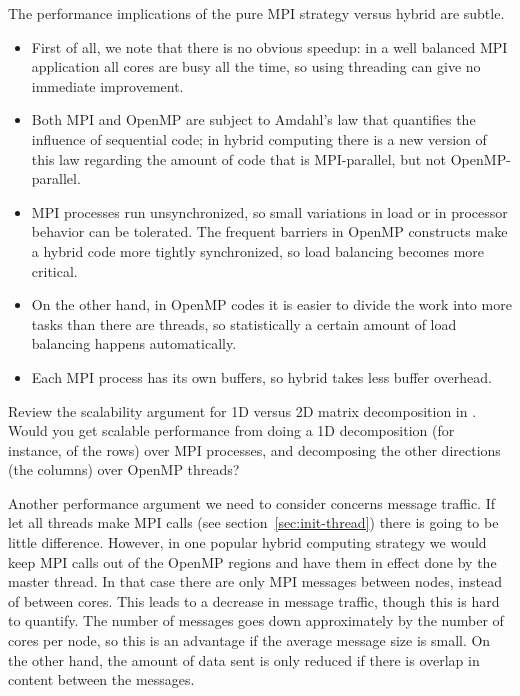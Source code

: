 The performance implications of the pure MPI strategy versus hybrid
are subtle.
\begin{itemize}
\item First of all, we note that there is no obvious speedup: in a
  well balanced MPI application all cores are busy all the time, so
  using threading can give no immediate improvement.
\item Both MPI and OpenMP are subject to Amdahl's law that quantifies
  the influence of sequential code; in hybrid computing there is a new
  version of this law regarding the amount of code that is
  MPI-parallel, but not OpenMP-parallel.
\item MPI processes run unsynchronized, so small variations in load or
  in processor behavior can be tolerated. The frequent barriers in
  OpenMP constructs make a hybrid code more tightly synchronized, so
  load balancing becomes more critical.
\item On the other hand, in OpenMP codes it is easier to divide the
  work into more tasks than there are threads, so statistically a
  certain amount of load balancing happens automatically.
\item Each MPI process has its own buffers, so hybrid takes less
  buffer overhead.
\end{itemize}

\begin{exercise}
  Review the scalability argument for 1D versus 2D matrix
  decomposition in . Would you get
  scalable performance from doing a 1D decomposition (for instance, of
  the rows) over MPI processes, and decomposing the other directions
  (the columns) over OpenMP threads?
\end{exercise}

Another performance argument we need to consider concerns message
traffic.  If let all threads make MPI calls (see
section~\ref{sec:init-thread}) there is going to be little
difference. However, in one popular hybrid computing strategy we would
keep MPI calls out of the OpenMP regions and have them in effect done
by the master thread.
%
In that case there are only MPI messages
between nodes, instead of between cores. This leads to a decrease in
message traffic, though this is hard to quantify. The number of
messages goes down approximately by the number of cores per node, so
this is an advantage if the average message size is small. On the
other hand, the amount of data sent is only reduced if there is
overlap in content between the messages.

